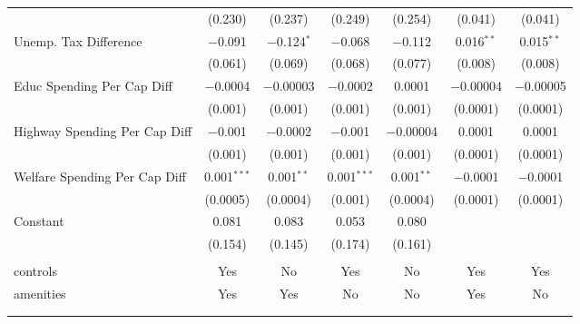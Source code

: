 \begin{table}[!htbp]
\begin{tabular}{@{\extracolsep{5pt}}lcccccc}
  & (0.230) & (0.237) & (0.249) & (0.254) & (0.041) & (0.041) \\ 
  Unemp. Tax Difference & $-$0.091 & $-$0.124$^{*}$ & $-$0.068 & $-$0.112 & 0.016$^{**}$ & 0.015$^{**}$ \\ 
  & (0.061) & (0.069) & (0.068) & (0.077) & (0.008) & (0.008) \\ 
  Educ Spending Per Cap Diff & $-$0.0004 & $-$0.00003 & $-$0.0002 & 0.0001 & $-$0.00004 & $-$0.00005 \\ 
  & (0.001) & (0.001) & (0.001) & (0.001) & (0.0001) & (0.0001) \\ 
  Highway Spending Per Cap Diff & $-$0.001 & $-$0.0002 & $-$0.001 & $-$0.00004 & 0.0001 & 0.0001 \\ 
  & (0.001) & (0.001) & (0.001) & (0.001) & (0.0001) & (0.0001) \\ 
  Welfare Spending Per Cap Diff & 0.001$^{***}$ & 0.001$^{**}$ & 0.001$^{***}$ & 0.001$^{**}$ & $-$0.0001 & $-$0.0001 \\ 
  & (0.0005) & (0.0004) & (0.001) & (0.0004) & (0.0001) & (0.0001) \\ 
  Constant & 0.081 & 0.083 & 0.053 & 0.080 &  &  \\ 
  & (0.154) & (0.145) & (0.174) & (0.161) &  &  \\ 
 \hline \\[-1.8ex] 
controls & Yes & No & Yes & No & Yes & Yes \\ 
amenities & Yes & Yes & No & No & Yes & No \\ 
\hline \\[-1.8ex] 
\hline 
\hline \\[-1.8ex] 
\end{tabular} 
\end{table} 
